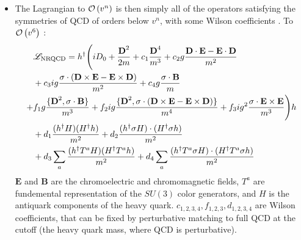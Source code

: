 \begin{itemize}
\item
  The Lagrangian to $\mathcal{O}\left( v^n \right)$ is then simply all of the operators satisfying the symmetries of QCD of orders below $v^n$, with some Wilson coefficients \cite{Lepage:1992tx}. To $\mathcal{O}\left( v^6 \right)$ \cite{Brambilla:2000cs}:
  \begin{align}
    \nonumber
    &\mathscr{L}_{\text{NRQCD}} = h^{\dagger} \Bigg( i D_0 + {{\textbf{D}}^2 \over 2m} + c_1 {{\textbf{D}}^4\over m^3}
    + c_2 g{{\textbf{D}}\cdot {\textbf{E}} - {\textbf{E}} \cdot {\textbf{D}} \over m^2} \\
    \nonumber
    &+ c_3 ig{ {\bf{\sigma}}\cdot ({\textbf{D}}\times {\textbf{E}} - {\textbf{E}}\times {\textbf{D}})\over m^2}
    + c_4 g{ {\bf{\sigma}}\cdot {\textbf{B}}\over m} \\
    + \nonumber
    & f_1 g{\{{\textbf{D}}^2,{\bf{\sigma}}\cdot {\textbf{B}}\}\over m^3 }
    + f_2 ig{\{ {\textbf{D}}^2,{\bf{\sigma}}\cdot ( {\textbf{D}}\times {\textbf{E}} - {\textbf{E}}\times {\textbf{D}})\}\over m^4 }
    + f_3 ig^2 {{\bf{\sigma}}\cdot {\textbf{E}}\times {\textbf{E}}\over m^3}  \Bigg)h \\
    \nonumber
    &+ d_1 { (h^{\dagger} H) (H^{\dagger} h) \over m^2} + d_2 { (h^{\dagger} {\bf{\sigma}} H) \cdot  (H^{\dagger}{\bf{\sigma}} h) \over m^2} \\
    &+ d_3 \sum_a {(h^{\dagger} T^a H) (H^{\dagger} T^a h) \over m^2} + d_4 \sum_a {(h^{\dagger} T^a {\bf{\sigma}} H) \cdot (H^{\dagger} T^a {\bf{\sigma}} h) \over m^2}
  \end{align}
  ${\textbf{E}}$ and ${\textbf{B}}$ are the chromoelectric and chromomagnetic fields, $T^a$ are fundemental representation of the $SU(3)$ color generators, and $H$ is the antiquark components of the heavy quark. $c_{1,2,3,4},f_{1,2,3},d_{1,2,3,4}$ are Wilson coefficients, that can be fixed by perturbative matching to full QCD at the cutoff (the heavy quark mass, where QCD is perturbative).

\end{itemize}
